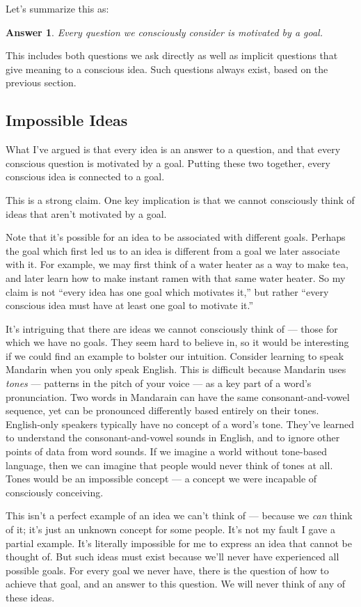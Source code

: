 \documentclass[11pt, oneside]{article}
\newtheorem*{answer}{Answer}
\begin{document}
Let's summarize this as:
\begin{answer}
    Every question we consciously consider is motivated by a goal.
\end{answer}
This includes both questions we ask directly as well as
implicit questions that give meaning to a conscious idea.
Such questions always exist, based on the previous
section.

\subsection{Impossible Ideas}

What I've argued is that every idea is an answer to a question, and that every
conscious question is motivated by a goal. Putting these two together,
every
conscious idea is connected to a goal.

This is a strong claim. One key implication is that we cannot consciously
think of ideas that aren't motivated by a goal.

Note that it's possible for an idea to be associated with different goals.
Perhaps the goal which first led us to an idea is
different from a goal we later associate with it. For example, we may first
think of a water heater as a way to make tea, and later learn how to make
instant ramen with that same water heater.
So my claim is not ``every idea has one goal which motivates it,'' but rather
``every conscious idea must have at least one goal to motivate it.''

It's intriguing that there are ideas we cannot consciously think of ---
those for
which we have no goals. They seem hard to believe in, so it would be
interesting if we could find an example to bolster our intuition.
Consider learning to speak Mandarin when you only speak English.
This is difficult because Mandarin uses {\em tones} --- patterns in the pitch of
your voice --- as a key part of a word's pronunciation.
Two words in Mandarain can have
the same consonant-and-vowel sequence, yet can be
pronounced differently based entirely on their tones.
English-only speakers typically have no concept of a word's tone.
They've learned to understand the consonant-and-vowel sounds in English, and to
ignore other points of data from word sounds. If we imagine a world without
tone-based language, then we can imagine that people would never think of
tones at all. Tones would be an impossible concept --- a concept we were
incapable of consciously conceiving.

This isn't a perfect example of an idea we can't think of --- because we {\em
can} think of it; it's just an unknown concept for some people.
It's not my fault I
gave a partial example.
It's literally impossible for me to express an idea that
cannot be thought of.
But such ideas must exist because we'll never
have experienced all possible goals.
For every goal we never have,
there is the question of how to achieve that goal, and an answer to this
question. We will never think of any of these ideas.
\end{document}
